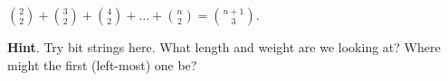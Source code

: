 \documentclass{book}
\begin{document}
\setcounter{cpjt}{102}
\addtocounter{cpjt}{-1}
\begin{activity}\label{activity-95}
\hypertarget{p-712}{}%
\(\binom{2}{2} + \binom{3}{2} + \binom{4}{2} + \ldots + \binom{n}{2} = \binom{n + 1}{3}\).%
\par\smallskip%
\noindent\textbf{Hint}.\hypertarget{hint-56}{}\quad%
\hypertarget{p-713}{}%
Try bit strings here.  What length and weight are we looking at?  Where might the first (left-most) one be?%
\par\smallskip%
\noindent\end{activity}

\clearpage
\end{document}
